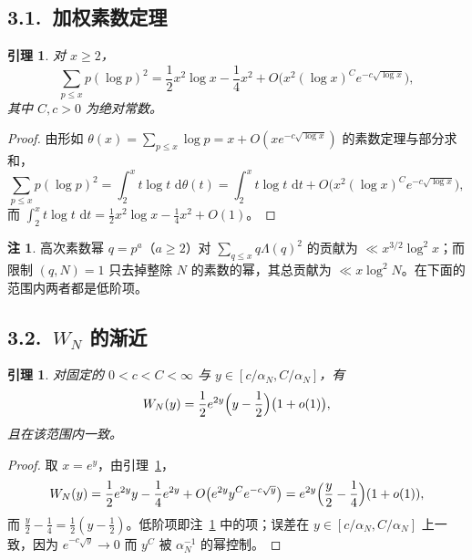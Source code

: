 \documentclass[12pt,a4paper]{amsart}
\numberwithin{equation}{section}
\theoremstyle{plain}
\newtheorem{lemma}[theorem]{引理}
\theoremstyle{definition}
\newtheorem{remark}[theorem]{注}
\newcommand{\dd}{\,\mathrm{d}}
\begin{document}
\subsection*{3.1.\ 加权素数定理}

\begin{lemma}\label{lem:pnt}
对 $x\ge2$，
\begin{equation}\label{eq:pnt}
 \sum_{p\le x}p(\log p)^2
 =\frac12x^2\log x-\frac14x^2+O\bigl(x^2(\log x)^Ce^{-c\sqrt{\log x}}\bigr),
\end{equation}
其中 $C,c>0$ 为绝对常数。
\end{lemma}

\begin{proof}
由形如
$\theta(x)=\sum_{p\le x}\log p=x+O(xe^{-c\sqrt{\log x}})$ 的素数定理与部分求和，
\[
 \sum_{p\le x}p(\log p)^2=\int_2^x t\log t\,\dd\theta(t)
 =\int_2^x t\log t\,\dd t+O\bigl(x^2(\log x)^Ce^{-c\sqrt{\log x}}\bigr),
\]
而 $\int_2^x t\log t\,\dd t=\frac12x^2\log x-\frac14x^2+O(1)$。
\end{proof}

\begin{remark}\label{rem:primepowers}
高次素数幂 $q=p^a$（$a\ge2$）对 $\sum_{q\le x}q\Lambda(q)^2$ 的贡献为
$\ll x^{3/2}\log^2x$；而限制 $(q,N)=1$ 只去掉整除 $N$ 的素数的幂，其总贡献为
$\ll x\log^2N$。在下面的范围内两者都是低阶项。
\end{remark}

\subsection*{3.2.\ $W_N$ 的渐近}

\begin{lemma}\label{lem:W}
对固定的 $0<c<C<\infty$ 与 $y\in[c/\alpha_N,C/\alpha_N]$，有
\begin{equation}\label{eq:W}
 W_N(y)=\frac12e^{2y}\Bigl(y-\frac12\Bigr)\bigl(1+o(1)\bigr),
\end{equation}
且在该范围内一致。
\end{lemma}

\begin{proof}
取 $x=e^y$，由引理~\ref{lem:pnt}，
\[
 W_N(y)=\frac12e^{2y}y-\frac14e^{2y}+O\bigl(e^{2y}y^Ce^{-c\sqrt{y}}\bigr)
 =e^{2y}\Bigl(\frac y2-\frac14\Bigr)(1+o(1)),
\]
而 $\frac y2-\frac14=\frac12(y-\frac12)$。低阶项即注~\ref{rem:primepowers}
中的项；误差在 $y\in[c/\alpha_N,C/\alpha_N]$ 上一致，因为
$e^{-c\sqrt{y}}\to0$ 而 $y^C$ 被 $\alpha_N^{-1}$ 的幂控制。
\end{proof}
\end{document}
